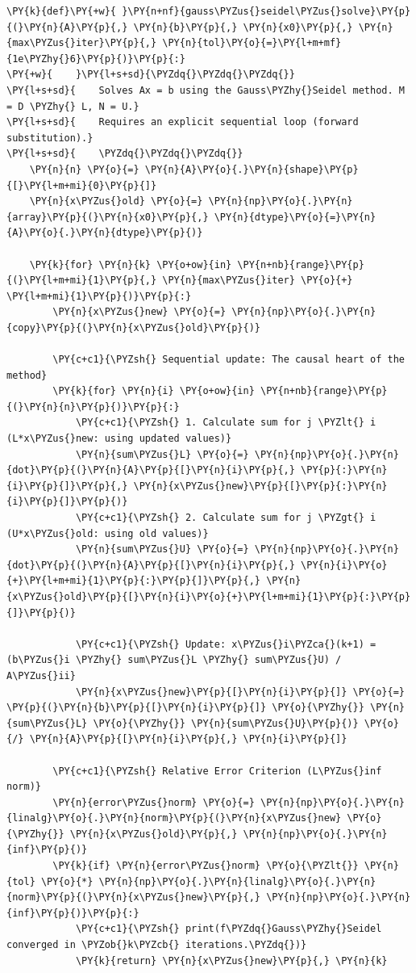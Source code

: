 \begin{Verbatim}[commandchars=\\\{\}]
\PY{k}{def}\PY{+w}{ }\PY{n+nf}{gauss\PYZus{}seidel\PYZus{}solve}\PY{p}{(}\PY{n}{A}\PY{p}{,} \PY{n}{b}\PY{p}{,} \PY{n}{x0}\PY{p}{,} \PY{n}{max\PYZus{}iter}\PY{p}{,} \PY{n}{tol}\PY{o}{=}\PY{l+m+mf}{1e\PYZhy{}6}\PY{p}{)}\PY{p}{:}
\PY{+w}{    }\PY{l+s+sd}{\PYZdq{}\PYZdq{}\PYZdq{}}
\PY{l+s+sd}{    Solves Ax = b using the Gauss\PYZhy{}Seidel method. M = D \PYZhy{} L, N = U.}
\PY{l+s+sd}{    Requires an explicit sequential loop (forward substitution).}
\PY{l+s+sd}{    \PYZdq{}\PYZdq{}\PYZdq{}}
    \PY{n}{n} \PY{o}{=} \PY{n}{A}\PY{o}{.}\PY{n}{shape}\PY{p}{[}\PY{l+m+mi}{0}\PY{p}{]}
    \PY{n}{x\PYZus{}old} \PY{o}{=} \PY{n}{np}\PY{o}{.}\PY{n}{array}\PY{p}{(}\PY{n}{x0}\PY{p}{,} \PY{n}{dtype}\PY{o}{=}\PY{n}{A}\PY{o}{.}\PY{n}{dtype}\PY{p}{)}
    
    \PY{k}{for} \PY{n}{k} \PY{o+ow}{in} \PY{n+nb}{range}\PY{p}{(}\PY{l+m+mi}{1}\PY{p}{,} \PY{n}{max\PYZus{}iter} \PY{o}{+} \PY{l+m+mi}{1}\PY{p}{)}\PY{p}{:}
        \PY{n}{x\PYZus{}new} \PY{o}{=} \PY{n}{np}\PY{o}{.}\PY{n}{copy}\PY{p}{(}\PY{n}{x\PYZus{}old}\PY{p}{)}
        
        \PY{c+c1}{\PYZsh{} Sequential update: The causal heart of the method}
        \PY{k}{for} \PY{n}{i} \PY{o+ow}{in} \PY{n+nb}{range}\PY{p}{(}\PY{n}{n}\PY{p}{)}\PY{p}{:}
            \PY{c+c1}{\PYZsh{} 1. Calculate sum for j \PYZlt{} i (L*x\PYZus{}new: using updated values)}
            \PY{n}{sum\PYZus{}L} \PY{o}{=} \PY{n}{np}\PY{o}{.}\PY{n}{dot}\PY{p}{(}\PY{n}{A}\PY{p}{[}\PY{n}{i}\PY{p}{,} \PY{p}{:}\PY{n}{i}\PY{p}{]}\PY{p}{,} \PY{n}{x\PYZus{}new}\PY{p}{[}\PY{p}{:}\PY{n}{i}\PY{p}{]}\PY{p}{)}
            \PY{c+c1}{\PYZsh{} 2. Calculate sum for j \PYZgt{} i (U*x\PYZus{}old: using old values)}
            \PY{n}{sum\PYZus{}U} \PY{o}{=} \PY{n}{np}\PY{o}{.}\PY{n}{dot}\PY{p}{(}\PY{n}{A}\PY{p}{[}\PY{n}{i}\PY{p}{,} \PY{n}{i}\PY{o}{+}\PY{l+m+mi}{1}\PY{p}{:}\PY{p}{]}\PY{p}{,} \PY{n}{x\PYZus{}old}\PY{p}{[}\PY{n}{i}\PY{o}{+}\PY{l+m+mi}{1}\PY{p}{:}\PY{p}{]}\PY{p}{)}
            
            \PY{c+c1}{\PYZsh{} Update: x\PYZus{}i\PYZca{}(k+1) = (b\PYZus{}i \PYZhy{} sum\PYZus{}L \PYZhy{} sum\PYZus{}U) / A\PYZus{}ii}
            \PY{n}{x\PYZus{}new}\PY{p}{[}\PY{n}{i}\PY{p}{]} \PY{o}{=} \PY{p}{(}\PY{n}{b}\PY{p}{[}\PY{n}{i}\PY{p}{]} \PY{o}{\PYZhy{}} \PY{n}{sum\PYZus{}L} \PY{o}{\PYZhy{}} \PY{n}{sum\PYZus{}U}\PY{p}{)} \PY{o}{/} \PY{n}{A}\PY{p}{[}\PY{n}{i}\PY{p}{,} \PY{n}{i}\PY{p}{]}
        
        \PY{c+c1}{\PYZsh{} Relative Error Criterion (L\PYZus{}inf norm)}
        \PY{n}{error\PYZus{}norm} \PY{o}{=} \PY{n}{np}\PY{o}{.}\PY{n}{linalg}\PY{o}{.}\PY{n}{norm}\PY{p}{(}\PY{n}{x\PYZus{}new} \PY{o}{\PYZhy{}} \PY{n}{x\PYZus{}old}\PY{p}{,} \PY{n}{np}\PY{o}{.}\PY{n}{inf}\PY{p}{)}
        \PY{k}{if} \PY{n}{error\PYZus{}norm} \PY{o}{\PYZlt{}} \PY{n}{tol} \PY{o}{*} \PY{n}{np}\PY{o}{.}\PY{n}{linalg}\PY{o}{.}\PY{n}{norm}\PY{p}{(}\PY{n}{x\PYZus{}new}\PY{p}{,} \PY{n}{np}\PY{o}{.}\PY{n}{inf}\PY{p}{)}\PY{p}{:}
            \PY{c+c1}{\PYZsh{} print(f\PYZdq{}Gauss\PYZhy{}Seidel converged in \PYZob{}k\PYZcb{} iterations.\PYZdq{})}
            \PY{k}{return} \PY{n}{x\PYZus{}new}\PY{p}{,} \PY{n}{k}
            

\end{Verbatim}
